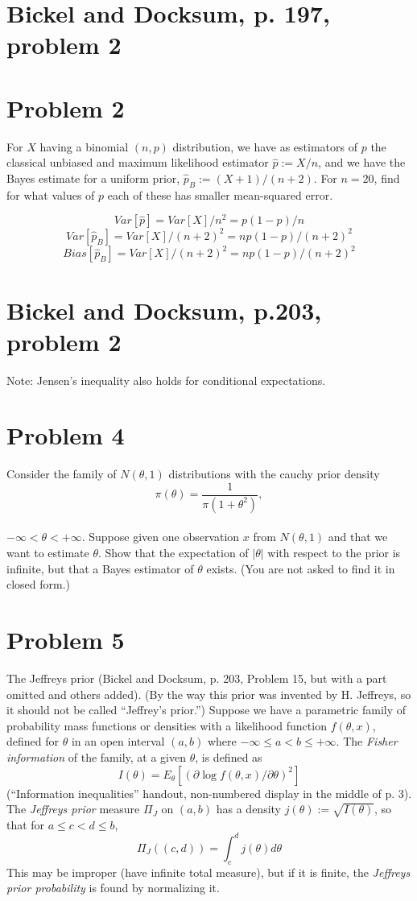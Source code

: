 \documentclass[11pt]{article}
\newcommand{\ProbS}{\iftrue}
\newcommand{\ProbE}{\fi}
\begin{document}
\section{Bickel and Docksum, p. 197, problem 2}

\section{Problem 2}
\ProbS
For $X$ having a binomial $(n,p)$ distribution, we have as estimators of $p$ the classical unbiased and maximum likelihood estimator
$
\hat{p} := X/n
$, and we have the Bayes estimate for a uniform prior,
$
\hat{p}_B := (X+1)/(n+2)
$. For $n=20$, find for what values of $p$ each of these has smaller mean-squared error.
\ProbE

$$
Var[\hat{p}] = Var[X] / n^2 = p(1-p)/n
$$
$$
Var[\hat{p}_B] = Var[X] / (n+2)^2 = np(1-p)/(n+2)^2
$$
$$
Bias[\hat{p}_B] = Var[X] / (n+2)^2 = np(1-p)/(n+2)^2
$$
\section{Bickel and Docksum, p.203, problem 2}
\ProbS
Note: Jensen's inequality also holds for conditional expectations.
\ProbE

\section{Problem 4}
\ProbS
Consider the family of $N(\theta, 1)$ distributions with the cauchy prior density
$$
\pi(\theta) = \frac{1}{\pi(1+\theta^2)},
$$
\\
$-\infty < \theta < +\infty$.
Suppose given one observation $x$ from $N(\theta, 1)$
and that we want to estimate $\theta$.
Show that the expectation of $|\theta|$ with respect to the prior is infinite, but that a Bayes estimator of $\theta$ exists.
(You are not asked to find it in closed form.)
\ProbE

\section{Problem 5}
\ProbS
The Jeffreys prior (Bickel and Docksum, p. 203, Problem 15, but with a part omitted and others added). (By the way this prior was invented by H. Jeffreys, so it should not be called ``Jeffrey's prior.'')
Suppose we have a parametric family of probability mass functions or densities with a likelihood function $f(\theta, x)$, defined for $\theta$ in an open interval $(a,b)$ where $-\infty \leq a < b \leq +\infty$.
The \emph{Fisher information} of the family, at a given $\theta$, is defined as
$$
I(\theta) = E_{\theta}[(\partial \log f(\theta, x) / \partial \theta)^2]
$$
(``Information inequalities'' handout, non-numbered display in the middle of p. 3). The \emph{Jeffreys prior} measure $\Pi_{J}$ on $(a,b)$ has a density
$
j(\theta) := \sqrt{I(\theta)}
$, so that for
$a \leq c < d \leq b$,
$$
\Pi_{J}((c,d)) = \int_{c}^{d} j(\theta) d\theta
$$
This may be improper (have infinite total measure), but if it is finite, the \emph{Jeffreys prior probability} is found by normalizing it.
\ProbE
\end{document}
